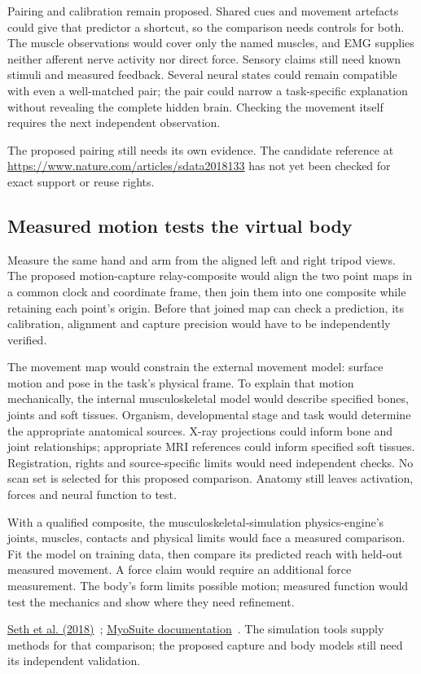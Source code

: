 Pairing and calibration remain proposed. Shared cues and movement artefacts
could give that predictor a shortcut, so the comparison needs controls for
both. The muscle observations would cover only the named muscles, and EMG
supplies neither afferent nerve activity nor direct force. Sensory claims
still need known stimuli and measured feedback. Several neural states could
remain compatible with even a well-matched pair; the pair could narrow a
task-specific explanation without revealing the complete hidden brain.
Checking the movement itself requires the next independent observation.
\par\noindent The proposed pairing still needs its own evidence. The candidate reference at \url{https://www.nature.com/articles/sdata2018133} has not yet been checked for exact support or reuse rights.

\subsection{Measured motion tests the virtual body}
Measure the same hand and arm from the aligned left and right tripod views.
The proposed motion-capture relay-composite would align the two point maps
in a common clock and coordinate frame, then join them into one composite
while retaining each point's origin. Before that joined map can check a
prediction, its calibration, alignment and capture precision would have to
be independently verified.

The movement map would constrain the external movement model: surface motion
and pose in the task's physical frame. To explain that motion mechanically,
the internal musculoskeletal model would describe specified bones, joints
and soft tissues. Organism, developmental stage and task would determine the
appropriate anatomical sources. X-ray projections could inform bone and
joint relationships; appropriate MRI references could inform specified soft
tissues. Registration, rights and source-specific limits would need independent
checks. No scan set is selected for this proposed comparison. Anatomy still
leaves activation, forces and neural function to test.

With a qualified composite, the musculoskeletal-simulation physics-engine's
joints, muscles, contacts and physical limits would face a measured comparison.
Fit the model on training data, then compare its predicted reach with
held-out measured movement. A force claim would require an additional force
measurement. The body's form limits possible motion; measured function would
test the mechanics and show where they need refinement.
\par\noindent \href{https://journals.plos.org/ploscompbiol/article?id=10.1371/journal.pcbi.1006223}{Seth et al. (2018)}~\cite{opensim2018}; \href{https://myosuite.readthedocs.io/en/latest/}{MyoSuite documentation}~\cite{myosuiteDocsUndated}. The simulation tools supply methods for that comparison; the proposed capture and body models still need its independent validation.

